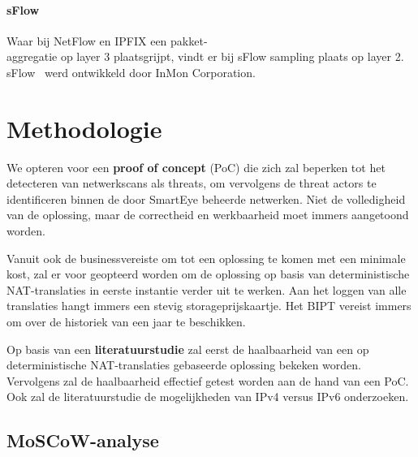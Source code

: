 \paragraph{sFlow}
Waar bij NetFlow en IPFIX een pakket-\\aggregatie op layer 3 plaatsgrijpt, vindt er bij sFlow sampling plaats op layer 2. sFlow~\autocite{Phaal2004} werd ontwikkeld door InMon Corporation.


\section{Methodologie}%
\label{sec:methodologie}

We opteren voor een \textbf{proof of concept} (PoC) die zich zal beperken tot het detecteren van netwerkscans als threats, om vervolgens de threat actors te identificeren binnen de door SmartEye beheerde netwerken. Niet de volledigheid van de oplossing, maar de correctheid en werkbaarheid moet immers aangetoond worden.

Vanuit ook de businessvereiste om tot een oplossing te komen met een minimale kost, zal er voor geopteerd worden om de oplossing op basis van deterministische NAT-translaties in eerste instantie verder uit te werken. Aan het loggen van alle translaties hangt immers een stevig storageprijskaartje. Het BIPT vereist immers om over de historiek van een jaar te beschikken.

Op basis van een \textbf{literatuurstudie} zal eerst de haalbaarheid van een op deterministische NAT-translaties gebaseerde oplossing bekeken worden. Vervolgens zal de haalbaarheid effectief getest worden aan de hand van een PoC. Ook zal de literatuurstudie de mogelijkheden van IPv4 versus IPv6 onderzoeken.

\subsection{MoSCoW-analyse}

